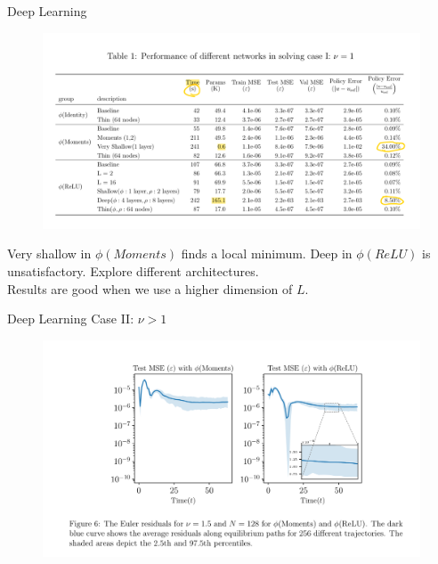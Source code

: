 \documentclass[dvipsnames,mathserif]{beamer}
\begin{document}
{\begin{frame}{Deep Learning}
\begin{figure}[h!]
\centering
\includegraphics[width = \textwidth]{6.png}
\end{figure}
Very shallow in $\phi(Moments)$ finds a local minimum. Deep in $\phi(ReLU)$ is unsatisfactory. Explore different architectures.\\
Results are good when we use a higher dimension of $L$.

\end{frame}

\begin{frame}{Deep Learning}
Case II: $\nu > 1$
\begin{figure}[h!]
\centering
\includegraphics[width = \textwidth]{7.png}
\end{figure}
\end{frame}

}
\end{document}
